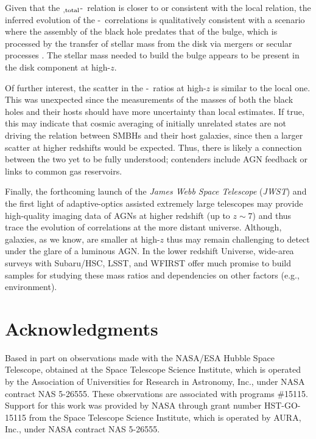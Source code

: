 \documentclass[apj]{emulateapj}
\begin{document}
Given that the \smass$_{\rm ,total}$-\mbh\ relation is closer to or consistent with the local relation, the inferred evolution of the \bmass-\mbh\ correlations is qualitatively consistent with a scenario where the assembly of the black hole predates that of the bulge, which is processed by the transfer of stellar mass from the disk via mergers or secular processes \citep{Jah++09,Bennert++2011,SS13}. The stellar mass needed to build the bulge appears to be present in the disk component at high-$z$.

Of further interest, the scatter in the \mbh-\smass\ ratios at high-$z$ is similar to the local one. This was unexpected since the measurements of the masses of both the black holes and their hosts should have more uncertainty than local estimates. If true, this may indicate that cosmic averaging of initially unrelated states \citep{Peng2007} are not driving the relation between SMBHs and their host galaxies, since then a larger scatter at higher redshifts would be expected. Thus, there is likely a connection between the two yet to be fully understood; contenders include AGN feedback or links to common gas reservoirs.

Finally, the forthcoming launch of the {\it James Webb Space Telescope} ({\it JWST}) and the first light of adaptive-optics assisted extremely large telescopes may provide high-quality imaging data of AGNs at higher redshift (up to $z\sim7$) and thus trace the evolution of correlations at the more distant universe. Although, galaxies, as we know, are smaller at high-$z$ thus may remain challenging to detect under the glare of a luminous AGN. In the lower redshift Universe, wide-area surveys with Subaru/HSC, LSST, and WFIRST offer much promise to build samples for studying these mass ratios and dependencies on other factors (e.g., environment).  

\section*{Acknowledgments}

Based in part on observations made with the NASA/ESA Hubble Space Telescope, obtained at the Space Telescope Science Institute, which is operated by the Association of Universities for Research in Astronomy, Inc., under NASA contract NAS 5-26555. These observations are associated with programs \#15115. Support for this work was provided by NASA through grant number HST-GO-15115 from the Space Telescope Science Institute, which is operated by AURA, Inc., under NASA contract NAS 5-26555.
\end{document}
